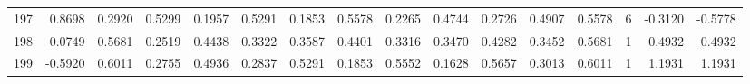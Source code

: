 \begin{tabular}{lrrrrrrrrrrrrrrr}
197 &      0.8698 &  0.2920 &  0.5299 &  0.1957 &  0.5291 &  0.1853 &  0.5578 &  0.2265 &  0.4744 &  0.2726 &   0.4907 &     0.5578 &      6 &                   -0.3120 &                    -0.5778 \\
198 &      0.0749 &  0.5681 &  0.2519 &  0.4438 &  0.3322 &  0.3587 &  0.4401 &  0.3316 &  0.3470 &  0.4282 &   0.3452 &     0.5681 &      1 &                    0.4932 &                     0.4932 \\
199 &     -0.5920 &  0.6011 &  0.2755 &  0.4936 &  0.2837 &  0.5291 &  0.1853 &  0.5552 &  0.1628 &  0.5657 &   0.3013 &     0.6011 &      1 &                    1.1931 &                     1.1931 \\
\bottomrule
\end{tabular}
